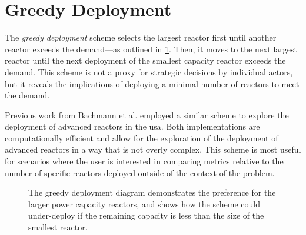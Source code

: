 \section{Greedy Deployment}
\label{sec:greedy_deployment}

The \textit{greedy deployment} scheme selects the largest reactor first until another
reactor exceeds the demand---as outlined in \ref{fig:greedy_diagram}. Then, it moves to the next largest reactor until the next deployment of the smallest capacity reactor exceeds the demand. This scheme is not a proxy for strategic decisions by individual actors, but it reveals the implications of deploying a minimal number of reactors to meet the demand.

Previous work from Bachmann et al. \cite{bachmann_enrichment_2021} employed a similar scheme to explore the deployment of advanced reactors in the \gls{usa}. Both implementations are computationally efficient and allow for the exploration of the deployment of advanced reactors in a way that is not overly complex. This scheme is most useful for scenarios where the user is interested in comparing metrics relative to the number of specific reactors deployed outside of the context of the problem.

\begin{figure}[H]
  \centering
  \caption{The greedy deployment diagram demonstrates the preference for the larger power capacity reactors, and shows how the scheme could under-deploy if the remaining capacity is less than the size of the smallest reactor.}
  \label{fig:greedy_diagram}
\end{figure}

